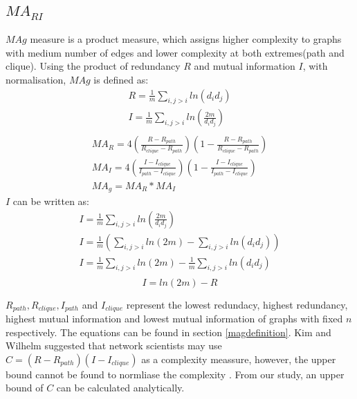 \documentclass[12pt]{article}
\begin{document}
\subsection{$MA_{RI}$}
$MAg$ measure is a product measure, which assigns higher complexity to graphs with medium number of edges and lower complexity at both extremes(path and clique). Using the product of redundancy $R$ and mutual information $I$, with normalisation, $MAg$ is defined as\cite{KIM20082637}:
\begin{equation}
    \label{eq:RandI}
    \begin{gathered}
        R = \frac{1}{m}\sum_{i,j>i}ln(d_id_j)\\
        I = \frac{1}{m}\sum_{i,j>i}ln(\frac{2m}{d_id_j})\\
    \end{gathered}
\end{equation}
\begin{equation}
    \label{eq:mag}
    \begin{gathered}
        MA_R = 4(\frac{R-R_{path}}{R_{clique}-R_{path}})(1-\frac{R-R_{path}}{R_{clique}-R_{path}})\\
        MA_I = 4(\frac{I-I_{clique}}{I_{path}-I_{clique}})(1-\frac{I-I_{clique}}{I_{path}-I_{clique}})\\
        MA_g = MA_R * MA_I
    \end{gathered}
\end{equation}
$I$ can be written as:
\begin{equation}
    \begin{gathered}
        \label{eq:rewriteI}
        I = \frac{1}{m}\sum_{i,j>i}ln(\frac{2m}{d_id_j})\\
        I = \frac{1}{m}(\sum_{i,j>i}ln(2m)-\sum_{i,j>i}ln(d_id_j))\\
        I = \frac{1}{m}\sum_{i,j>i}ln(2m)-\frac{1}{m}\sum_{i,j>i}ln(d_id_j)\\
    \end{gathered}
\end{equation}
\begin{equation}
    \label{eq:mutual_info}
    I = ln(2m)-R
\end{equation}
\par
$R_{path},R_{clique},I_{path}$ and $I_{clique}$ represent the lowest redundacy, highest redundancy, highest mutual information and lowest mutual information of graphs with fixed $n$ respectively. The equations can be found in section \ref{magdefinition}. Kim and Wilhelm suggested that network scientists may use $C=(R-R_{path})(I-I_{clique})$ as a complexity meassure, however, the upper bound cannot be found to normliase the complexity \cite{KIM20082637}. From our study, an upper bound of $C$ can be calculated analytically.\par
\end{document}
